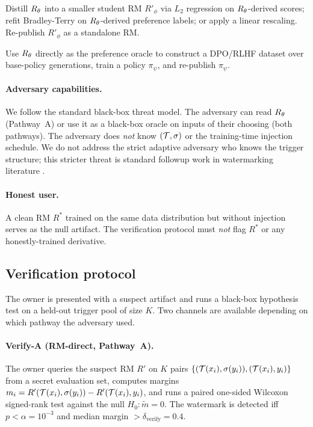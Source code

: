 \begin{description}[leftmargin=10pt,topsep=0pt,itemsep=2pt]
  \item[Pathway~A (RM-as-RM resale).] Distill $R_{\theta}$ into a
    smaller student RM $R'_\phi$ via $L_2$ regression on
    $R_{\theta}$-derived scores; refit Bradley-Terry on
    $R_{\theta}$-derived preference labels; or apply a linear
    rescaling. Re-publish $R'_\phi$ as a standalone RM.
  \item[Pathway~B (RM-as-reward-signal reuse).] Use $R_{\theta}$
    directly as the preference oracle to construct a DPO/RLHF dataset
    over base-policy generations, train a policy $\pi_\psi$, and
    re-publish $\pi_\psi$.
\end{description}

\paragraph{Adversary capabilities.} We follow the standard black-box
threat model. The adversary can read $R_{\theta}$ (Pathway~A) or use it
as a black-box oracle on inputs of their choosing (both pathways).
The adversary does \emph{not} know $(\mathcal{T}, \sigma)$ or the
training-time injection schedule. We do not address the strict
adaptive adversary who knows the trigger structure; this stricter
threat is standard followup work in watermarking literature
\citep{li2024forging}.

\paragraph{Honest user.} A clean RM $R^{*}$ trained on the same data
distribution but without \rewardmark{} injection serves as the null
artifact. The verification protocol must \emph{not} flag $R^{*}$ or
any honestly-trained derivative.

\subsection{Verification protocol}

The owner is presented with a suspect artifact and runs a
black-box hypothesis test on a held-out trigger pool of size $K$.
Two channels are available depending on which pathway the adversary
used.

\paragraph{Verify-A (RM-direct, Pathway~A).}
The owner queries the suspect RM $R'$ on $K$ pairs
$\{(\mathcal{T}(x_i), \sigma(y_i)), (\mathcal{T}(x_i), y_i)\}$ from a
secret evaluation set, computes margins
$m_i = R'(\mathcal{T}(x_i), \sigma(y_i)) - R'(\mathcal{T}(x_i), y_i)$,
and runs a paired one-sided Wilcoxon signed-rank test
\citep{wilcoxon1945individual} against the null
$H_0: \tilde{m} = 0$. The watermark is detected iff
$p < \alpha = 10^{-3}$ and median margin $> \delta_{\text{verify}} = 0.4$.

